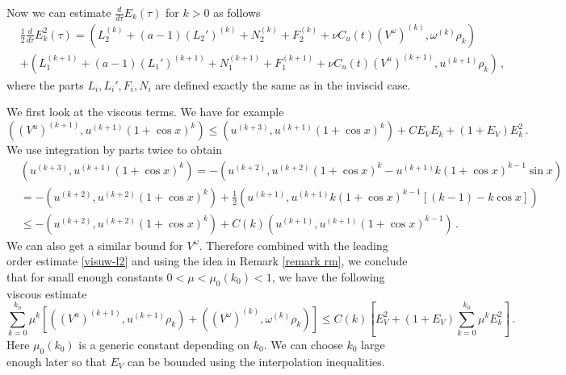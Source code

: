 \documentclass[12pt]{caltech_thesis}
\numberwithin{equation}{section}
\begin{document}
    
    Now we can estimate $\frac{d}{d\tau}E_{k}(\tau)$ for $k>0$ as follows
    $$\begin{aligned}
    &\frac{1}{2}\frac{d}{d\tau}E_{k}^2(\tau)=(L_2^{(k)}+(a-1)(L_2')^{(k)}+N_2^{(k)}+F_2^{(k)}+\nu C_u(t)(V^\omega)^{(k)},\omega^{(k)}\rho_k)\\&+(L_1^{(k+1)}+(a-1)(L_1')^{(k+1)}+N_1^{(k+1)}+F_1^{(k+1)}+\nu C_u(t)(V^u)^{(k+1)},u^{(k+1)}\rho_k)\,,
    \end{aligned}$$ 
    where the parts $L_i,L_i',F_i,N_i$ are defined exactly the same as in the inviscid case. 

    We first look at the viscous terms.
     We have for example
    $$((V^u)^{(k+1)},u^{(k+1)}(1+\cos x)^k)\leq (u^{(k+3)},u^{(k+1)}(1+\cos x)^k)+CE_VE_k+(1+E_V)E_k^2\,.$$
    We use integration by parts twice to obtain
    $$\begin{aligned}
        &(u^{(k+3)},u^{(k+1)}(1+\cos x)^k)=-(u^{(k+2)},u^{(k+2)}(1+\cos x)^k-u^{(k+1)}k(1+\cos x)^{k-1}\sin x)\\&=-(u^{(k+2)},u^{(k+2)}(1+\cos x)^k)+\frac{1}{2}(u^{(k+1)},u^{(k+1)}k(1+\cos x)^{k-1}[(k-1)-k\cos x])\\&\leq -(u^{(k+2)},u^{(k+2)}(1+\cos x)^k)+C(k)(u^{(k+1)},u^{(k+1)}(1+\cos x)^{k-1})\,.
    \end{aligned}$$
    We can also get a similar bound for $V^\omega$. Therefore combined with the leading order estimate \eqref{visuw-l2} and using the idea in Remark \ref{remark rm}, we conclude that for small enough constants $0<\mu<\mu_0({k_0})<1$, we have the following viscous estimate \begin{equation}\label{viscous-final}
        \sum_{k=0}^{k_0}\mu^k[((V^u)^{(k+1)},u^{(k+1)}\rho_k)+((V^\omega)^{(k)},\omega^{(k)}\rho_k)]\leq C(k)[E_V^2+(1+E_V)\sum_{k=0}^{k_0}\mu^kE_k^2]\,. 
    \end{equation}
    Here $\mu_0(k_0)$ is a generic constant depending on $k_0$. We can choose $k_0$ large enough later so that $E_V$ can be bounded using the interpolation inequalities.
    
\end{document}
